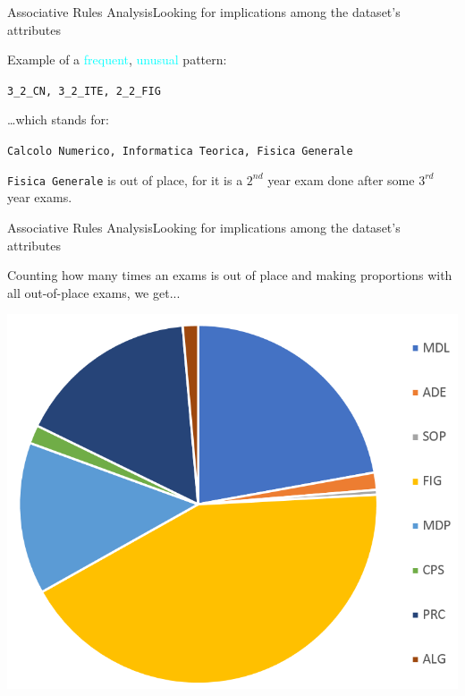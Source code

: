 \begin{frame}{Associative Rules Analysis}{Looking for implications among the dataset's attributes}

    \alert{Example} of a \textcolor{cyan}{frequent}, \textcolor{cyan}{unusual} pattern: \\

	\vspace{0.3cm}
	\begin{centering}
		\texttt{3\_2\_CN, 3\_2\_ITE, 2\_2\_FIG}\\
	\end{centering}
	\vspace{0.3cm}

	\ldots which stands for:

	\vspace{0.3cm}
	\begin{centering}
	\texttt{Calcolo Numerico, Informatica Teorica, Fisica Generale}\\
	\end{centering}
	\vspace{0.6cm}

	\texttt{Fisica Generale} is \alert{out of place}, for it is a $2^{nd}$ year exam done after some $3^{rd}$ year exams.\\

\end{frame}

\begin{frame}{Associative Rules Analysis}{Looking for implications among the dataset's attributes}

\vspace{0.1cm}
	Counting how many times an exams is out of place and making proportions with all out-of-place exams, we get...\\ \vspace{0.2cm}

    \begin{centering}
        \hspace*{2cm}\includegraphics[scale=0.25]{seq2.png}
    \end{centering}

\end{frame}
